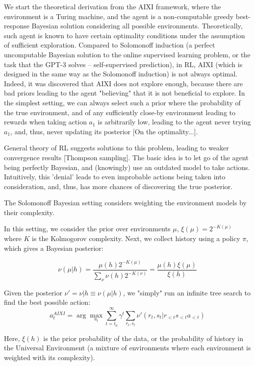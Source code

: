 \documentclass[a4paper,11pt,oneside]{report}
\begin{document}
We start the theoretical derivation from the AIXI framework, where the environment is a Turing machine, and the agent is a non-computable greedy best-response Bayesian solution considering all possible environments. Theoretically, such agent is known to have certain optimality conditions under the assumption of sufficient exploration. Compared to Solomonoff  induction (a perfect uncomputable Bayesian solution to the online supervised learning problem, or the task that the GPT-3 solves -- self-supervised prediction), in RL, AIXI (which is designed in the same way as the Solomonoff induction) is not always optimal. Indeed, it was discovered that AIXI does not explore enough, because there are bad priors leading to the agent "believing" that it is not beneficial to explore. In the simplest setting, we can always select such a prior where the probability of the true environment, and of any sufficiently close-by environment leading to rewards when taking action $a_1$ is arbitrarily low, leading to the agent never trying $a_1$, and, thus, never updating its posterior [On the optimality...].

General theory of RL suggests solutions to this problem, leading to weaker convergence results [Thompson sampling]. The basic idea is to let go of the agent being perfectly Bayesian, and (knowingly) use an outdated model to take actions. Intuitively, this 'denial' leads to even improbable actions being taken into consideration, and, thus, has more chances of discovering the true posterior.

The Solomonoff Bayesian setting considers weighting the environment models by their complexity.

In this setting, we consider the prior over environments $\mu$, $\xi(\mu)=2^{-K(\mu)}$ where $K$ is the Kolmogorov complexity. Next, we collect history using a policy $\pi$, which gives a Bayesian posterior:

$$
\nu(\mu|h)=\frac{\mu(h)2^{-K(\mu)}}{\sum_{\nu}\nu(h)2^{-K(\nu)}}=\frac{\mu(h)\xi(\mu)}{\xi(h)}
$$

Given the posterior $\nu'=\nu|h\equiv \nu(\mu|h)$, we "simply" run an infinite tree search to find the best possible action:
$$
a_t^{AIXI}=\arg\max_{a_t}\sum\limits_{t=t_0}^{\infty}\gamma^t\sum_{r_t,s_t}\nu'(r_t,s_t|r_{<t}s_{<t}a_{<t})
$$

Here, $\xi(h)$ is the prior probability of the data, or the probability of history in the Universal Environment (a mixture of environments where each environment is weighted with its complexity).
\end{document}
